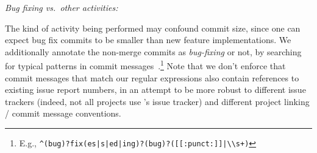 
\smallskip\noindent\emph{Bug fixing vs.\ other activities:} 

The kind of activity being performed may confound commit size, \eg since one 
can expect bug fix commits to be smaller than new feature implementations.
We additionally annotate the non-merge commits as \emph{bug-fixing} or not, 
by searching for typical patterns in commit 
messages~\cite{mockus2000identifying}.\footnote{E.g., \verb$^(bug)?fix(es|s|ed|ing)?(bug)?([[:punct:]]|\\s+)$}
Note that we don't enforce that commit messages that match our regular
expressions also contain references to existing issue report numbers, in an
attempt to be more robust to different issue trackers (indeed, not all projects 
use \GH's issue tracker) and different project linking / commit message conventions.
%
%




